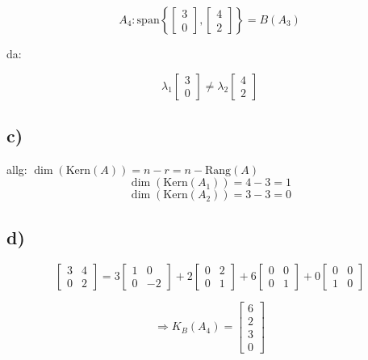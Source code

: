 \documentclass[a4paper, 11pt]{article}
\begin{document}
$$A_4: \text{span} \left\{\begin{bmatrix} 3 \\ 0\end{bmatrix}, \begin{bmatrix} 4 \\
2\end{bmatrix}\right\} = B(A_3)$$

da:

$$\lambda_1\begin{bmatrix} 3 \\ 0\end{bmatrix} \neq \lambda_2\begin{bmatrix} 4 \\ 2\end{bmatrix}$$

\subsection{c)}
\label{sec:org4cbcb43}
allg: \(\dim(\text{Kern}(A)) = n - r = n - \text{Rang}(A)\)
$$ \dim(\text{Kern}(A_1)) = 4 - 3 = 1 $$
$$ \dim(\text{Kern}(A_2)) = 3 - 3 = 0 $$

\subsection{d)}
\label{sec:org81092a5}

\begin{equation*}
    \begin{bmatrix} 3 & 4 \\ 0 & 2\end{bmatrix} = 3\begin{bmatrix} 1 & 0 \\ 0 & -2\end{bmatrix} +
    2\begin{bmatrix} 0 & 2 \\ 0 & 1\end{bmatrix} + 6\begin{bmatrix} 0 & 0 \\ 0 & 1\end{bmatrix} +
    0\begin{bmatrix} 0 & 0 \\ 1 & 0\end{bmatrix}
\end{equation*}


\begin{equation*}
    \Rightarrow K_B(A_4) = \begin{bmatrix} 6 \\ 2 \\ 3 \\ 0\end{bmatrix}
\end{equation*}
\end{document}
